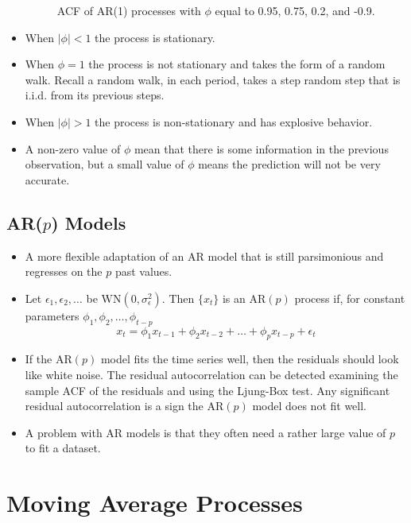 \documentclass[11pt]{article}
\begin{document}
\begin{itemize}
\begin{figure}[H]
        \caption{ACF of AR(1) processes with $\phi$ equal to 0.95, 0.75, 0.2, and -0.9.}
    \end{figure}
    \item When $|\phi| < 1$ the process is stationary.
    \item When $\phi=1$ the process is not stationary and takes the form of a random walk.
    Recall a random walk, in each period, takes a step random step that is i.i.d. from its 
    previous steps. 
    \item When $|\phi|>1$ the process is non-stationary and has explosive behavior.
    \item A non-zero value of $\phi$ mean that there is some information in the previous
    observation, but a small value of $\phi$ means the prediction will not be very accurate.
\end{itemize}

\subsection{AR($p$) Models}
\begin{itemize}
    \item A more flexible adaptation of an AR model that is still parsimonious and regresses on
    the $p$ past values.
    \item Let $\epsilon_1, \epsilon_2, \ldots$ be $\text{WN}(0, \sigma_{\epsilon}^{2})$. Then 
    $\{x_t\}$ is an $\text{AR}(p)$ process if, for constant parameters $\phi_1, \phi_2, \hdots,
    \phi_{t-p}$
    \[x_t = \phi_1 x_{t-1} + \phi_2 x_{t-2} + \hdots + \phi_p x_{t-p} + \epsilon_t\]
    \item If the $\text{AR}(p)$ model fits the time series well, then the residuals should look 
    like white noise. The residual autocorrelation can be detected examining the sample ACF of
    the residuals and using the Ljung-Box test. Any significant residual autocorrelation is a sign 
    the $\text{AR}(p)$ model does not fit well.
    \item A problem with AR models is that they often need a rather large value of $p$ to fit 
    a dataset.
\end{itemize}


\section{Moving Average Processes}
\end{document}
